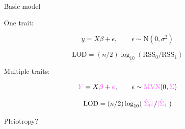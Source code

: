 \documentclass[12pt]{article}
\newcommand{\headsize}{\fontsize{35}{35} \selectfont}
\newcommand{\smallsize}{\fontsize{25}{30} \selectfont}
\newcommand{\smallersize}{\fontsize{20}{25} \selectfont}
\begin{document}
\newpage

\headsize \color{myyellow}
\hfill \begin{minipage}{5.75in}
\centering
Basic model
\end{minipage}

\vspace{25mm}

\color{white} \smallsize

One trait:

\vspace{-18pt}

{\color{myblue} $$ y = X \beta + \epsilon, \qquad \epsilon \sim \text{N}(0, \sigma^2) $$}

\vspace{-8pt}

{\color{myblue} $$ \text{LOD} = (n/2) \log_{10} ( \text{RSS}_0 /
  \text{RSS}_1 ) $$ }

\vspace{15mm}

Multiple traits:

\vspace{-18pt}

{\color{myblue} $$ {\color{mypink} Y} = X {\color{mypink}
    \boldsymbol{\beta}} + {\color{mypink} \boldsymbol{\epsilon}},
  \qquad \epsilon \sim \text{\color{mypink} MVN}(0, {\color{mypink} \Sigma}) $$ }

\vspace{-8pt}

{\color{myblue} $$ \text{LOD} = (n/2) \log_{10} ( {\color{mypink} |\hat{\Sigma}_0|} /
  {\color{mypink} |\hat{\Sigma}_1|}) $$ }



\newpage

\headsize \color{myyellow}
\hfill \begin{minipage}{5.75in}
\centering
Pleiotropy?
\end{minipage}

\vspace{25mm}

\color{mywhite} \smallersize
\end{document}
